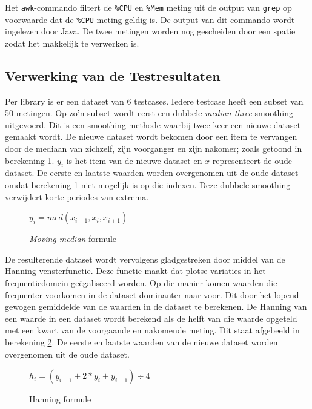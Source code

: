 Het \verb+awk+-commando filtert de \verb+%CPU+ en \verb+%Mem+ meting uit de output van \verb+grep+ op voorwaarde dat de \verb+%CPU+-meting geldig is. De output van dit commando wordt ingelezen door Java. De twee metingen worden nog gescheiden door een spatie zodat het makkelijk te verwerken is.

\subsection{Verwerking van de Testresultaten}
\label{sec:methodologie:verwerking}

Per library is er een dataset van 6 testcases. Iedere testcase heeft een subset van 50 metingen. Op zo'n subset wordt eerst een dubbele \textit{median three} smoothing uitgevoerd. \autocite{mediansmoothing} Dit is een smoothing methode waarbij twee keer een nieuwe dataset gemaakt wordt. De nieuwe dataset wordt bekomen door een item te vervangen door de mediaan van zichzelf, zijn voorganger en zijn nakomer; zoals getoond in berekening \ref{math:mediansmooth}. $y_{i}$ is het item van de nieuwe dataset en $x$ representeert de oude dataset. De eerste en laatste waarden worden overgenomen uit de oude dataset omdat berekening \ref{math:mediansmooth} niet mogelijk is op die indexen. Deze dubbele smoothing verwijdert korte periodes van extrema.

\begin{figure}
\centering
$y_{i} = med(x_{i-1}, x_{i}, x_{i+1})$
\caption{\textit{Moving median} formule}
\label{math:mediansmooth}
\end{figure}

De resulterende dataset wordt vervolgens gladgestreken door middel van de Hanning vensterfunctie. Deze functie maakt dat plotse variaties in het frequentiedomein geëgaliseerd worden. Op die manier komen waarden die frequenter voorkomen in de dataset dominanter naar voor. Dit door het lopend gewogen gemiddelde van de waarden in de dataset te berekenen. De Hanning van een waarde in een dataset wordt berekend als de helft van die waarde opgeteld met een kwart van de voorgaande en nakomende meting. Dit staat afgebeeld in berekening \ref{math:hanningformule}. De eerste en laatste waarden van de nieuwe dataset worden overgenomen uit de oude dataset. \autocite{hanning}

\begin{figure}
\centering
$h_{i} = (y_{i-1} + 2 \ast y_{i} + y_{i+1}) \div 4$
\caption{Hanning formule}
\label{math:hanningformule}
\end{figure}

